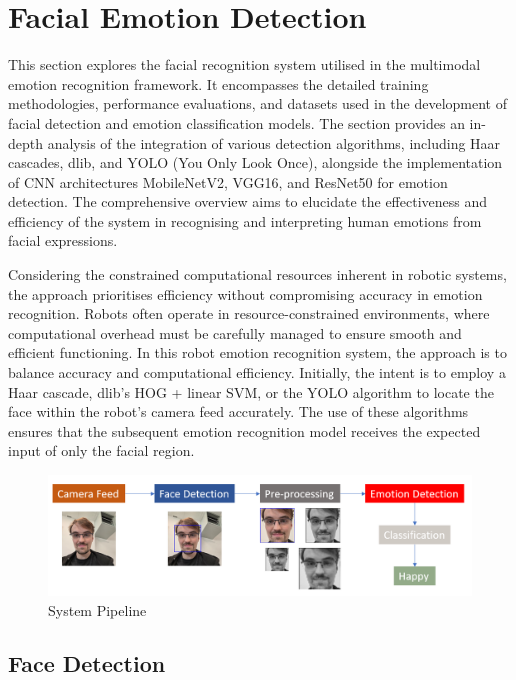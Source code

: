 \chapter{Facial Emotion Detection}

This section explores the facial recognition system utilised in the multimodal emotion recognition framework. It encompasses the detailed training methodologies, performance evaluations, and datasets used in the development of facial detection and emotion classification models. The section provides an in-depth analysis of the integration of various detection algorithms, including Haar cascades, dlib, and YOLO (You Only Look Once), alongside the implementation of CNN architectures MobileNetV2, VGG16, and ResNet50 for emotion detection. The comprehensive overview aims to elucidate the effectiveness and efficiency of the system in recognising and interpreting human emotions from facial expressions.

Considering the constrained computational resources inherent in robotic systems, the approach prioritises efficiency without compromising accuracy in emotion recognition. Robots often operate in resource-constrained environments, where computational overhead must be carefully managed to ensure smooth and efficient functioning. In this robot emotion recognition system, the approach is to balance accuracy and computational efficiency. Initially, the intent is to employ a Haar cascade, dlib's HOG + linear SVM, or the YOLO algorithm to locate the face within the robot's camera feed accurately. The use of these algorithms ensures that the subsequent emotion recognition model receives the expected input of only the facial region. 

\begin{figure}[!htb]
    \centering 
    \includegraphics[scale=0.35]{fed_images/pipeline.png}
    \caption{System Pipeline}
    \label{figure:pipeline}
\end{figure}

\section{Face Detection}

